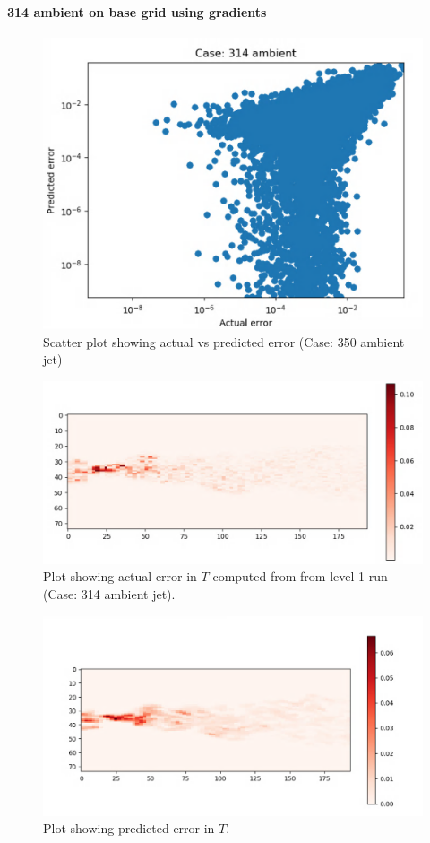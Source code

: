 \documentclass{article}
\begin{document}
\paragraph{314 ambient on base grid using gradients}

\begin{figure}[h!]
    \centering
    \includegraphics[width=0.6\linewidth]{figures/314_01_cnn_grad_error_scatter.png}
    \caption{Scatter plot showing actual vs predicted error (Case: 350 ambient jet)}
    \label{amr_err}
\end{figure}

\begin{figure}[h!]
    \centering
    \includegraphics[width =0.85\linewidth]{figures/314_01_cnn_grad_actual.png}
    \caption{Plot showing actual error in $T$ computed from from level 1 run (Case: 314 ambient jet).}
    \label{amr_err}
\end{figure}

\begin{figure}[h!]
    \centering
    \includegraphics[width = 0.9\linewidth]{figures/314_01_cnn_grad_pred.png}
    \caption{Plot showing predicted error in $T$.}
    \label{amr_err}
\end{figure}
\end{document}

